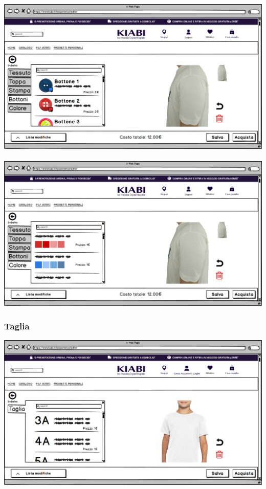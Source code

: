 \documentclass[12pt,italian,]{report}
\begin{document}
\\
\\
\includegraphics{balsamiq/Editor - caratteristica maniche bottoni.png}
\\
\\
\includegraphics{balsamiq/Editor - caratteristica maniche colore.png}
\subsubsection{Taglia} 
\includegraphics{balsamiq/Editor - caratteristica capo taglia.png}
\end{document}
